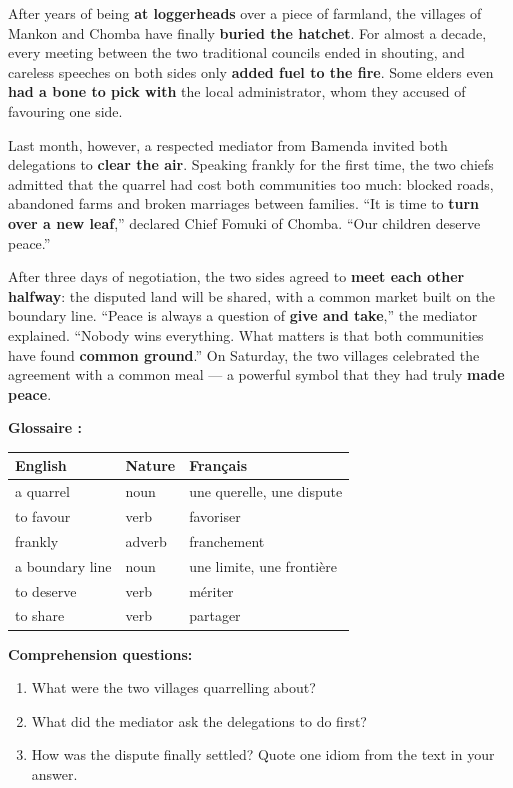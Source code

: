 \documentclass[11pt]{article}
\begin{document}
\begin{textebox}
After years of being \textbf{at loggerheads} over a piece of farmland, the villages of Mankon and Chomba have finally \textbf{buried the hatchet}. For almost a decade, every meeting between the two traditional councils ended in shouting, and careless speeches on both sides only \textbf{added fuel to the fire}. Some elders even \textbf{had a bone to pick with} the local administrator, whom they accused of favouring one side.

Last month, however, a respected mediator from Bamenda invited both delegations to \textbf{clear the air}. Speaking frankly for the first time, the two chiefs admitted that the quarrel had cost both communities too much: blocked roads, abandoned farms and broken marriages between families. “It is time to \textbf{turn over a new leaf},” declared Chief Fomuki of Chomba. “Our children deserve peace.”

After three days of negotiation, the two sides agreed to \textbf{meet each other halfway}: the disputed land will be shared, with a common market built on the boundary line. “Peace is always a question of \textbf{give and take},” the mediator explained. “Nobody wins everything. What matters is that both communities have found \textbf{common ground}.” On Saturday, the two villages celebrated the agreement with a common meal — a powerful symbol that they had truly \textbf{made peace}.
\end{textebox}

\textbf{Glossaire :}

\begin{center}
\begin{tabularx}{\linewidth}{|l|l|X|}
\hline
\rowcolor{popblueL} \textbf{English} & \textbf{Nature} & \textbf{Français} \\
\hline
a quarrel & noun & une querelle, une dispute \\
\hline
to favour & verb & favoriser \\
\hline
frankly & adverb & franchement \\
\hline
a boundary line & noun & une limite, une frontière \\
\hline
to deserve & verb & mériter \\
\hline
to share & verb & partager \\
\hline
\end{tabularx}
\end{center}

\textbf{Comprehension questions:}
\begin{enumerate}
\item What were the two villages quarrelling about?
\item What did the mediator ask the delegations to do first?
\item How was the dispute finally settled? Quote one idiom from the text in your answer.
\end{enumerate}
\end{document}
